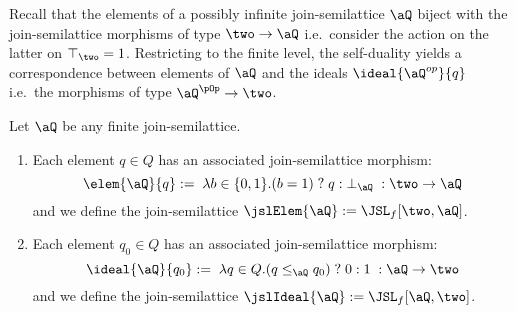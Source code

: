 \documentclass{article}
\begin{document}
Recall that the elements of a possibly infinite join-semilattice $\aQ$ biject with the join-semilattice morphisms of type $\two \to \aQ$ i.e.\ consider the action on the latter on $\top_\two = 1$. Restricting to the finite level, the self-duality yields a correspondence between elements of $\aQ$ and the ideals $\ideal{\aQ^{op}}{q}$ i.e.\ the morphisms of type $\aQ^{\pOp} \to \two$.

\begin{definition}
\label{def:elem_ideal_mor}
\item
Let $\aQ$ be any finite join-semilattice.
\begin{enumerate}
\item
Each element $q \in Q$ has an associated join-semilattice morphism:
\[
\elem{\aQ}{q} :=  \; \lambda b \in \{0,1\}. (b = 1) \; ? \; q : \bot_\aQ \; :  \two \to \aQ
\]
and we define the join-semilattice $\jslElem{\aQ} := \JSL_f[\two,\aQ]$.

\item
Each element $q_0 \in Q$ has an associated join-semilattice morphism:
\[
\ideal{\aQ}{q_0} := \; \lambda q \in Q. (q \leq_\aQ q_0) \; ? \; 0 : 1 \; : \aQ \to \two
\]
and we define the join-semilattice $\jslIdeal{\aQ} := \JSL_f[\aQ,\two]$. \endbox

\end{enumerate}
\end{definition}
\end{document}
